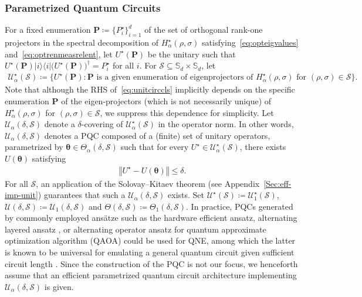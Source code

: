 \documentclass[a4paper,onecolumn,11pt,accepted=2026-05-12]{quantumarticle}
\newcommand{\bra}[1]{\langle#1|}
\newcommand{\ket}[1]{|#1\rangle}
\newcommand{\norm}[1]{\left\Vert#1\right\Vert}
\newcommand{\cS}{\mathcal{S}}
\newcommand{\cU}{\mathcal{U}}
\begin{document}
\subsubsection{Parametrized Quantum Circuits}\label{Sec:PQC}
For a fixed enumeration $\mathbf{P}\coloneqq\{P_i^{\star}\}_{i=1}^d$ of the set of orthogonal rank-one projectors in the spectral decomposition of $H_{\alpha}^{\star}(\rho,\sigma)$ satisfying~\eqref{eq:opteigvalues} and~\eqref{eq:optrenmeasrelent}, let $U^{\star}(\mathbf{P})$ be the unitary such that $U^{\star}(\mathbf{P})\ket{i}\!\bra{i}\big(U^{\star}(\mathbf{P})\big)^{\dag}=P_i^{\star}$ for all $i$. 
For $\cS \subseteq \mathbb{S}_d \times \mathbb{S}_d$, let 
\begin{align}
\cU_{\alpha}^{\star}(\cS)\coloneqq \{U^{\star}(\mathbf{P}): \mathbf{P} \mbox{ is a given enumeration of  eigenprojectors of } H_{\alpha}^{\star}(\rho,\sigma)\mbox{ for }(\rho,\sigma) \in \cS  \}. \label{eq:unitcirccls}  
\end{align} 
Note that although the RHS of~\eqref{eq:unitcirccls} implicitly depends on the specific enumeration $\mathbf{P}$ of the eigen-projectors (which is not necessarily unique) of $H_{\alpha}^{\star}(\rho,\sigma)$ for $(\rho,\sigma) \in \cS$,   we suppress this dependence for simplicity. 
Let $\cU_{\alpha}(\delta,\cS)$  denote a $\delta$-covering of $\cU_{\alpha}^{\star}(\cS)$ in the operator norm.  
In other words, $\cU_{\alpha}(\delta,\cS)$  denotes a PQC composed of a (finite) set of  unitary operators,  parametrized by $\bm{\theta} \in  \Theta_{\alpha}(\delta,\cS)$  such that  for every $U^{\star} \in \cU_{\alpha}^{\star}(\cS)$, there exists $U(\bm{\theta})$ satisfying
\begin{align}
 \norm{U^{\star}-U(\bm{\theta})} \leq \delta. \label{eq:unitaryapprox}   \end{align}
 For all $\cS$, an application of the Solovay--Kitaev theorem (see Appendix~\ref{Sec:eff-imp-unit})  guarantees that such a $\cU_{\alpha}(\delta,\cS)$ exists. 
 Set $ \cU^{\star}(\cS) \coloneqq \cU_{1}^{\star}(\cS)$, $\cU(\delta,\cS) \coloneqq \cU_{1}(\delta,\cS)$ and $\Theta(\delta,\cS) \coloneqq \Theta_{1}(\delta,\cS)$. 
In practice, PQCs generated by commonly employed  ans\"{a}tze such as the hardware efficient ansatz\cite{kandala2017hardware}, alternating layered ansatz \cite{Cerezo2021CostDependent},    or alternating operator ansatz for quantum approximate optimization algorithm (QAOA) could be used for QNE, among which the latter is known to be universal for emulating a general quantum circuit given sufficient circuit length \cite{lloyd2018universalqaoa,morales2020universality}. 
Since the construction of the PQC is not our focus, we henceforth assume that an efficient parametrized quantum circuit architecture implementing $\cU_{\alpha}(\delta,\cS)$ is given.
\end{document}
